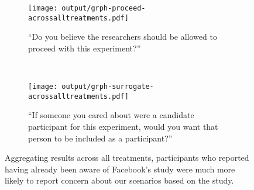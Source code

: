 
\begin{figure}
\centering
    \begin{subfigure}[b]{0.4\textwidth}
        \centering
        \texttt{[image: output/grph-proceed-acrossalltreatments.pdf]}
            \caption{``Do you believe the researchers should be allowed to proceed with this experiment?''}
            \label{fig:awarevsunaware:proceed}
    \end{subfigure}
    \\
    \begin{subfigure}[b]{0.4\textwidth}
        \centering
        \texttt{[image: output/grph-surrogate-acrossalltreatments.pdf]}
            \caption{``If someone you cared about were a candidate participant for this experiment, would you want that person to be included as a participant?''}
            \label{fig:awarevsunaware:surrogate}
    \end{subfigure}%
\caption{Aggregating results across all treatments, participants who reported having already been aware of Facebook's study were much more likely to report concern about our scenarios based on the study.}
\label{fig:awarevsunaware}
\end{figure}
